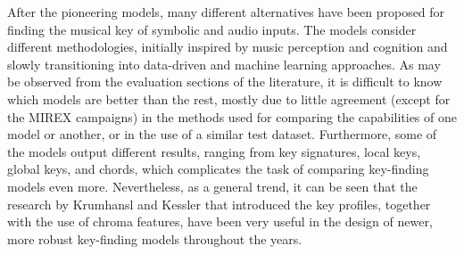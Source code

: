 After the pioneering models, many different alternatives
have been proposed for finding the musical key of symbolic
and audio inputs. The models consider different
methodologies, initially inspired by music perception and
cognition and slowly transitioning into data-driven and
machine learning approaches. As may be observed from the
evaluation sections of the literature, it is difficult to
know which models are better than the rest, mostly due to
little agreement (except for the MIREX campaigns) in the
methods used for comparing the capabilities of one model or
another, or in the use of a similar test dataset.
Furthermore, some of the models output different results,
ranging from key signatures, local keys, global keys, and
chords, which complicates the task of comparing key-finding
models even more. Nevertheless, as a general trend, it can
be seen that the research by Krumhansl and Kessler that
introduced the key profiles, together with the use of chroma
features, have been very useful in the design of newer, more
robust key-finding models throughout the years.
